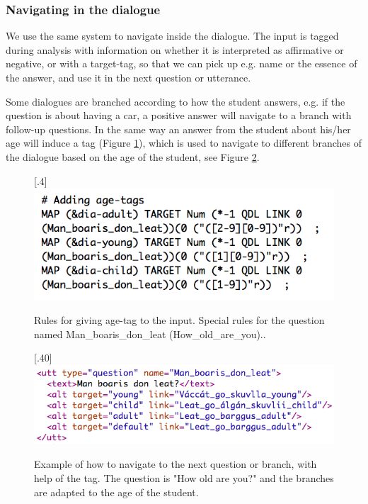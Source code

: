 \documentclass[11pt]{article}
\begin{document}
\subsubsection{Navigating in the dialogue}\label{navigation}
We use the same system to navigate inside the dialogue. The input is tagged during analysis with information on whether it is interpreted as affirmative or negative, or with a target-tag, so that we can pick up e.g. name or the essence of the answer, and use it in the next question or utterance. 

Some dialogues are branched according to how the student answers, e.g. if the question is about having a car, a positive answer will navigate to a branch with follow-up questions. In the same way an answer from the student about his/her age will induce a tag (Figure \ref{age}), which is used to navigate to different branches of the dialogue based on the age of the student, see Figure \ref{branch}.


\begin{figure}[htbp]
\begin{center}
\scalebox{.4}[.4]{\includegraphics{presentation/img/picking_age2.png}}\\
\caption{Rules for giving age-tag to the input. Special rules for the question named Man\_boaris\_don\_leat (How\_old\_are\_you)..}
\label{age}
\end{center}
\end{figure}


\begin{figure}[htbp]
\begin{center}
\scalebox{.40}[.40]{\includegraphics{presentation/img/Man_boaris.png}}\\
\caption{Example of how to navigate to the next question or branch, with help of the tag. The question is "How old are you?" and the branches are adapted to the age of the student.}
\label{branch}
\end{center}
\end{figure}
\end{document}
